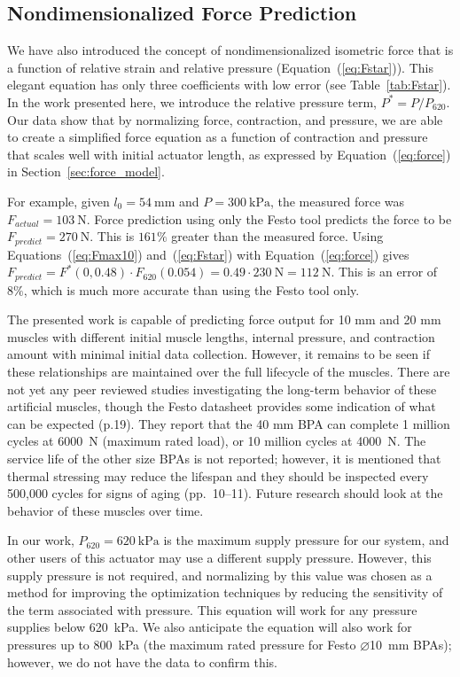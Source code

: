 \subsection{Nondimensionalized Force Prediction}

We have also introduced the concept of nondimensionalized isometric force that is a function of relative strain and relative pressure (Equation~(\ref{eq:Fstar})). This elegant equation has only three coefficients with low error (see Table~\ref{tab:Fstar}). In the work presented here, we introduce the relative pressure term, $P^*=P/P_{620}$. Our data show that by normalizing force, contraction, and pressure, we are able to create a simplified force equation as a function of contraction and pressure that scales well with initial actuator length, as expressed by Equation~(\ref{eq:force}) in Section~\ref{sec:force_model}.

For example, given $l_0=\qty{54}{\mm}$ and $P=\qty{300}{\kPa}$, the measured force was \mbox{$F_{actual} = \qty{103}{\N}$.} Force prediction using only the Festo tool predicts the force to be \mbox{$F_{predict} = \qty{270}{\N}$.} This is $161\%$ greater than the measured force. Using Equations~(\ref{eq:Fmax10}) and~(\ref{eq:Fstar}) with Equation~(\ref{eq:force}) gives $F_{predict} = F^*(0, 0.48) \cdot F_{620}(0.054) = 0.49 \cdot \qty{230}{\N} = \qty{112}{\N}$. This is an error of $8\%$, which is much more accurate than using the Festo tool only.

The presented work is capable of predicting force output for 10 mm and 20 mm muscles with different initial muscle lengths, internal pressure, and contraction amount with minimal initial data collection. However, it remains to be seen if these relationships are maintained over the full lifecycle of the muscles. There are not yet any peer reviewed studies investigating the long-term behavior of these artificial muscles, though the Festo datasheet provides some indication of what can be expected \citep{festo_2026} (p.19). They report that the 40 mm BPA can complete 1 million cycles at \qty{6000}{\N} (maximum rated load), or 10 million cycles at \qty{4000}{\N}. The service life of the other size BPAs is not reported; however, it is mentioned that thermal stressing may reduce the lifespan and they should be inspected every 500,000 cycles for signs of aging \citep{festo_2018} (pp.~10--11). Future research should look at the behavior of these muscles over time.

In our work, $P_{620}=\qty{620}{\kPa}$ is the maximum supply pressure for our system, and other users of this actuator may use a different supply pressure. However, this supply pressure is not required, and normalizing by this value was chosen as a method for improving the optimization techniques by reducing the sensitivity of the term associated with pressure. This equation will work for any pressure supplies below \qty{620}{\kPa}. We also anticipate the equation will also work for pressures up to \qty{800}{\kPa} (the maximum rated pressure for Festo $\diameter$\qty{10}{\mm} BPAs); however, we do not have the data to confirm this.

